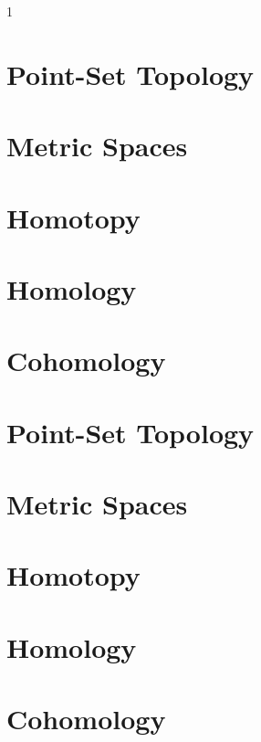 \documentclass{book}                                                           %
\newcommand*{\TOPPATH}{books}
\newcommand*{\PATH}{\TOPPATH/}
\newcounter{endpage}
\def\compiletopology{0}
\begin{document}
    \setcounter{endpage}{\thepage}
    \label{book:Topology}%
    \renewcommand{\PATH}{\TOPPATH/Topology}
    \setcounter{page}{\value{endpage}}

    \if\compiletopology1
        \part{Point-Set Topology}
            
            
        \part{Metric Spaces}
        \part{Homotopy}
            
        \part{Homology}
        \part{Cohomology}
    \else
        \part{Point-Set Topology}
        \part{Metric Spaces}
        \part{Homotopy}
        \part{Homology}
        \part{Cohomology}
    \fi
    \clearpage

    \setcounter{endpage}{\thepage}
    \label{book:Analysis}%
    \renewcommand{\PATH}{\TOPPATH/Analysis}
    \setcounter{page}{\value{endpage}}
\end{document}
